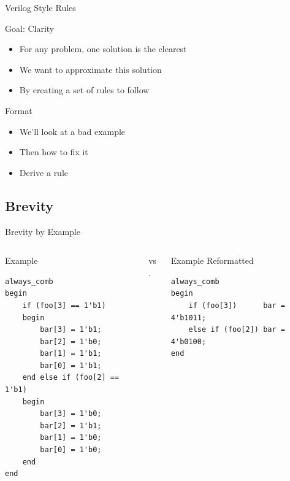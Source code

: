 \documentclass[dvipsnames]{beamer}
\begin{document}
\begin{frame}{Verilog Style Rules}
	\begin{block}{Goal: Clarity}
		\begin{itemize}
			\item For any problem, one solution is the clearest
			\item We want to approximate this solution
			\item By creating a set of rules to follow
		\end{itemize}
	\end{block}
	\begin{block}{Format}
		\begin{itemize}
			\item We'll look at a bad example
			\item Then how to fix it
			\item Derive a rule
		\end{itemize}
	\end{block}
\end{frame}

\subsection{Brevity}

\begin{frame}[fragile]{Brevity by Example}
\begin{columns}
	\begin{column}[T]{0.45\textwidth}
		\begin{block}{Example}
		\begin{verbatim}
always_comb
begin
    if (foo[3] == 1'b1)
    begin
        bar[3] = 1'b1;
        bar[2] = 1'b0;
        bar[1] = 1'b1;
        bar[0] = 1'b1;
    end else if (foo[2] == 1'b1)
    begin
        bar[3] = 1'b0;
        bar[2] = 1'b1;
        bar[1] = 1'b0;
        bar[0] = 1'b0;
    end
end
		\end{verbatim}
		\end{block}
	\end{column}
	\pause
	\begin{column}[T]{0.1\textwidth}
		\vspace*{0.25\textheight}
		\large{vs.}
		\normalsize
	\end{column}
	\begin{column}[T]{0.45\textwidth}
		\begin{block}{Example Reformatted}
		\begin{verbatim}
always_comb
begin
    if (foo[3])      bar = 4'b1011;
    else if (foo[2]) bar = 4'b0100;
end
		\end{verbatim}
		\end{block}
	\end{column}
\end{columns}
\end{frame}
\end{document}
